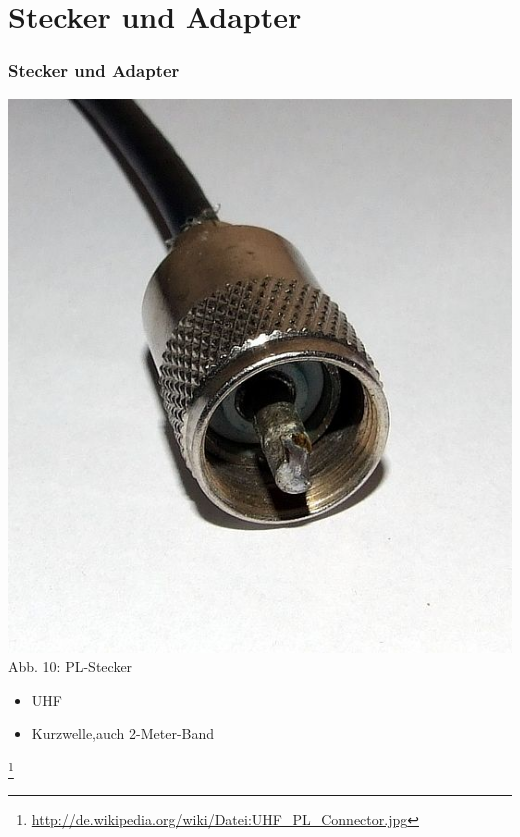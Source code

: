 \section*{Stecker und Adapter}
\begin{frame}
\frametitle{Stecker und Adapter}
\begin{center}
	\includegraphics[scale=0.25]{e10/pl.jpg}\\
	Abb. 10: PL-Stecker
	\begin{itemize}
		\item UHF
		\item Kurzwelle,auch 2-Meter-Band
	\end{itemize}
	\footnote{\url{http://de.wikipedia.org/wiki/Datei:UHF_PL_Connector.jpg}}
\end{center}
\end{frame}

